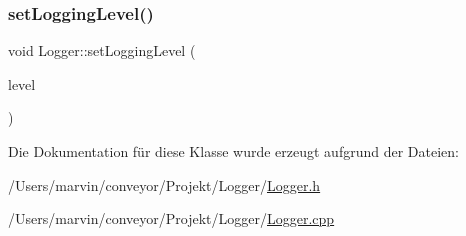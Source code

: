 \subsubsection{\texorpdfstring{set\+Logging\+Level()}{setLoggingLevel()}}
{\footnotesize\ttfamily void Logger\+::set\+Logging\+Level (\begin{DoxyParamCaption}\item[{\hyperlink{_logger_8h_aa5a9053636a30269210c54e734e0d583}{L\+O\+G\+\_\+\+L\+E\+V\+EL}}]{level }\end{DoxyParamCaption})}



Die Dokumentation für diese Klasse wurde erzeugt aufgrund der Dateien\+:\begin{DoxyCompactItemize}
\item 
/\+Users/marvin/conveyor/\+Projekt/\+Logger/\hyperlink{_logger_8h}{Logger.\+h}\item 
/\+Users/marvin/conveyor/\+Projekt/\+Logger/\hyperlink{_logger_8cpp}{Logger.\+cpp}\end{DoxyCompactItemize}
